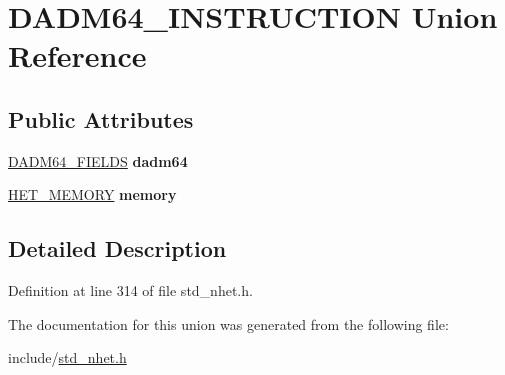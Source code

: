 \hypertarget{unionDADM64__INSTRUCTION}{}\section{D\+A\+D\+M64\+\_\+\+I\+N\+S\+T\+R\+U\+C\+T\+I\+ON Union Reference}
\label{unionDADM64__INSTRUCTION}
\subsection*{Public Attributes}
\begin{DoxyCompactItemize}
\item 
\mbox{\label{unionDADM64__INSTRUCTION_a72098313d16bc3edf477dda696233249}} 
\mbox{\hyperlink{structdadm64__format}{D\+A\+D\+M64\+\_\+\+F\+I\+E\+L\+DS}} {\bfseries dadm64}
\item 
\mbox{\label{unionDADM64__INSTRUCTION_aaa302d487bda167a0b38824ffae78d7c}} 
\mbox{\hyperlink{structmemory__format}{H\+E\+T\+\_\+\+M\+E\+M\+O\+RY}} {\bfseries memory}
\end{DoxyCompactItemize}


\subsection{Detailed Description}


Definition at line 314 of file std\+\_\+nhet.\+h.



The documentation for this union was generated from the following file\+:\begin{DoxyCompactItemize}
\item 
include/\mbox{\hyperlink{std__nhet_8h}{std\+\_\+nhet.\+h}}\end{DoxyCompactItemize}
